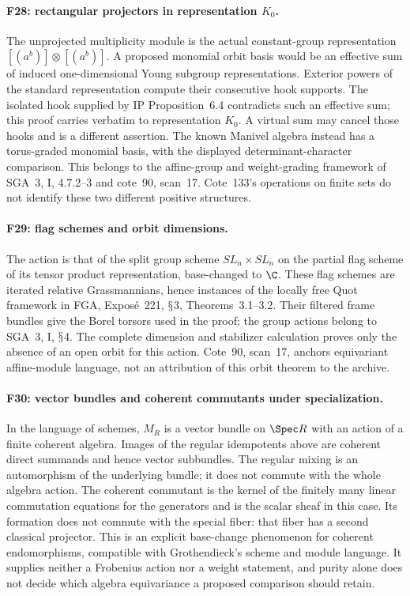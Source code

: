 \documentclass[11pt,a4paper]{article}
\renewcommand{\S}{\ensuremath{\mathsection}}
\newcommand{\fid}[1]{\textsf{#1}}\newcommand{\gate}[1]{\textsf{#1}}
\theoremstyle{named}\newtheorem{finding}{Finding}[section]
\theoremstyle{definition}\newtheorem{definition}[finding]{Definition}
\theoremstyle{remark}\newtheorem{remark}[finding]{Remark}
\begin{document}
\paragraph{\fid{F28}: rectangular projectors in representation $K_0$.}
The unprojected multiplicity module is the actual constant-group
representation $[(a^b)]\otimes[(a^b)]$. A proposed monomial orbit
basis would be an effective sum of induced one-dimensional Young
subgroup representations. Exterior powers of the standard
representation compute their consecutive hook supports. The
isolated hook supplied by IP Proposition~6.4 contradicts such an
effective sum; this proof carries verbatim to representation $K_0$.
A virtual sum may cancel those hooks and is a different assertion.
The known Manivel algebra instead has a torus-graded monomial basis,
with the displayed determinant-character comparison. This belongs
to the affine-group and weight-grading framework of SGA~3, I,
4.7.2--3 and cote~90, scan~17. Cote~133's operations on finite sets
do not identify these two different positive structures.


\paragraph{\fid{F29}: flag schemes and orbit dimensions.}
The action is that of the split group scheme $SL_n\times SL_n$ on
the partial flag scheme of its tensor product representation,
base-changed to $\C$. These flag schemes are iterated relative
Grassmannians, hence instances of the locally free Quot framework
in FGA, Expos\'e~221, \S3, Theorems~3.1--3.2. Their filtered
frame bundles give the Borel torsors used in the proof; the group
actions belong to SGA~3, I, \S4. The complete dimension and
stabilizer calculation proves only the absence of an open orbit for
this action. Cote~90, scan~17, anchors equivariant affine-module
language, not an attribution of this orbit theorem to the archive.

\paragraph{\fid{F30}: vector bundles and coherent commutants under specialization.}
In the language of schemes, $M_R$ is a vector bundle on $\Spec R$
with an action of a finite coherent algebra. Images of the regular
idempotents above are coherent direct summands and hence vector
subbundles. The regular mixing is an automorphism of the underlying
bundle; it does not commute with the whole algebra action. The coherent
commutant is the kernel of the finitely many linear commutation
equations for the generators and is the scalar sheaf in this case.
Its formation does not commute with the special fiber: that fiber
has a second classical projector. This is an explicit base-change
phenomenon for coherent endomorphisms, compatible with Grothendieck's
scheme and module language. It supplies neither a Frobenius action nor
a weight statement, and purity alone does not decide which algebra
equivariance a proposed comparison should retain.
\end{document}
